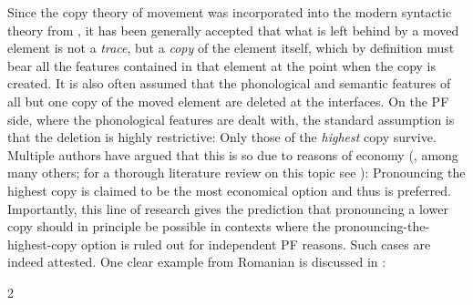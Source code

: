 \documentclass[output=paper,colorlinks,citecolor=brown
]{langscibook}
\begin{document}
\largerpage[2]
 Since the copy theory of movement was incorporated into the modern syntactic theory from \citet{chomsky1993minimalist,chomsky1995minimalist}, it has been generally accepted that what is left behind by a moved element is not a \textit{trace}, but a \textit{copy} of the element itself, which by definition must bear all the features contained in that element at the point when the copy is created. It is also often assumed that the phonological and semantic features of all but one copy of the moved element are deleted at the interfaces. On the PF side, where the phonological features are dealt with, the standard assumption is that the deletion is highly restrictive: Only those of the \textit{highest} copy survive. Multiple authors have argued that this is so due to reasons of economy (\citealp{franks1998clitics,nunes2004linearization}, among many others; for a thorough literature review on this topic see \citealp{boskovic2007copy}): Pronouncing the highest copy is claimed to be the most economical option and thus is preferred. Importantly, this line of research gives the prediction that pronouncing a lower copy should in principle be possible in contexts where the pronouncing-the-highest-copy option is ruled out for independent PF reasons. Such cases are indeed attested. One clear example from Romanian is discussed in \citet{bovskovic2002multiple}:

\begin{multicols}{2}

\ea\label{ex;chen:WHATWHO}
  \begin{xlist}
  \label{ex;chen:WHATWHO1}

  \end{xlist}
\z

\columnbreak

\ea
  \begin{xlist}
  \label{ex:chen:WHOWHO1}

  \label{ex:chen:WHOWHO2}
  \end{xlist}
\z

\end{multicols}
\end{document}
